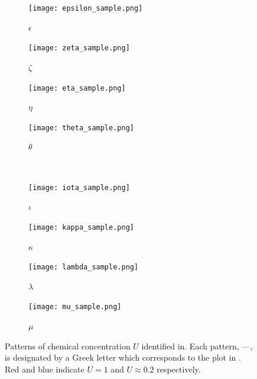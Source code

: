 \begin{figure}[h]
         \begin{subfigure}[b]{0.2\textwidth}
                \texttt{[image: epsilon\_sample.png]}
                \caption{$\epsilon$}
                \label{fig:epsilon_sample}
        \end{subfigure}
        \begin{subfigure}[b]{0.2\textwidth}
                \texttt{[image: zeta\_sample.png]}
                \caption{$\zeta$}
                \label{fig:zeta_sample}
        \end{subfigure}
        \begin{subfigure}[b]{0.2\textwidth}
                \texttt{[image: eta\_sample.png]}
                \caption{$\eta$}
                \label{fig:eta_sample}
        \end{subfigure}
        \begin{subfigure}[b]{0.2\textwidth}
                \texttt{[image: theta\_sample.png]}
                \caption{$\theta$}
                \label{fig:theta_sample}
        \end{subfigure} \hfill \\
        \begin{subfigure}[b]{0.2\textwidth}
                \texttt{[image: iota\_sample.png]}
                \caption{$\iota$}
                \label{fig:iota_sample}
        \end{subfigure}
         \begin{subfigure}[b]{0.2\textwidth}
                \texttt{[image: kappa\_sample.png]}
                \caption{$\kappa$}
                \label{fig:kappa_sample}
        \end{subfigure}
        \begin{subfigure}[b]{0.2\textwidth}
                \texttt{[image: lambda\_sample.png]}
                \caption{$\lambda$}
                \label{fig:lambda_sample}
        \end{subfigure}
        \begin{subfigure}[b]{0.2\textwidth}
                \texttt{[image: mu\_sample.png]}
                \caption{$\mu$}
                \label{fig:mu_sample}
        \end{subfigure} \hfill
        \caption{Patterns of chemical concentration $U$ identified in. Each pattern, ---, is designated by a Greek letter which corresponds to the plot in . Red and blue indicate $U=1$ and $U\approx 0.2$ respectively.}\label{fig:pearson}
\end{figure}

